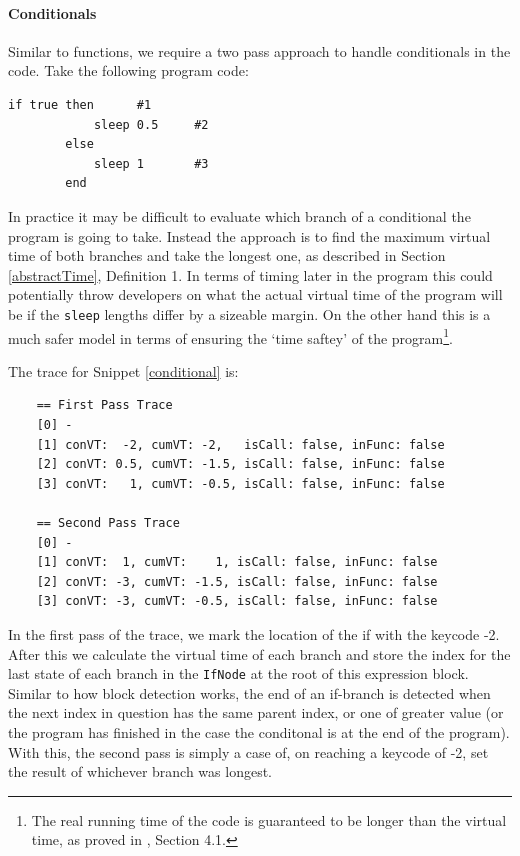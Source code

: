 \documentclass[11pt, abstracton, twoside, titlepage=true]{scrartcl}
\begin{document}
\paragraph{Conditionals}
Similar to functions, we require a two pass approach to handle conditionals in the 
code. Take the following program code:

\begin{minipage}{\textwidth}
	\begin{lstlisting}[style = sonicpi]
        if true then      #1
            sleep 0.5     #2
        else
            sleep 1       #3
        end
	\end{lstlisting}
	 \label{conditional}
\end{minipage}

In practice it may be difficult to evaluate which branch of a conditional the
program is going to take. Instead the approach is to find the maximum virtual time 
of both branches and take the longest one, as described in Section \ref{abstractTime},
Definition 1. In terms of timing later in the program this could potentially throw 
developers on what the actual virtual time of the program will be if the 
\texttt{sleep} lengths differ by a sizeable margin. On the other hand this is a much 
safer model in terms of ensuring the `time saftey' of the program\footnote{The real 
running time of the code is guaranteed to be longer than the virtual time, as proved 
in \cite{AOB14}, Section 4.1.}.

The trace for Snippet \ref{conditional} is:
\\
\begin{lstlisting}
    == First Pass Trace
    [0] -
    [1] conVT:  -2, cumVT: -2,   isCall: false, inFunc: false
    [2] conVT: 0.5, cumVT: -1.5, isCall: false, inFunc: false
    [3] conVT:   1, cumVT: -0.5, isCall: false, inFunc: false

    == Second Pass Trace
    [0] -
    [1] conVT:  1, cumVT:    1, isCall: false, inFunc: false
    [2] conVT: -3, cumVT: -1.5, isCall: false, inFunc: false
    [3] conVT: -3, cumVT: -0.5, isCall: false, inFunc: false
\end{lstlisting}

In the first pass of the trace, we mark the location of the if with the keycode 
-2. After this we calculate the virtual time of each branch and store the index 
for the last state of each branch in the \texttt{IfNode} at the root of this 
expression block. Similar to how block detection works, the end of an if-branch 
is detected when the next index in question has the same parent index, or one 
of greater value (or the program has finished in the case the conditonal is at 
the end of the program). With this, the second pass is simply a case of, on reaching 
a keycode of -2, set the result of whichever branch was longest.
\end{document}
